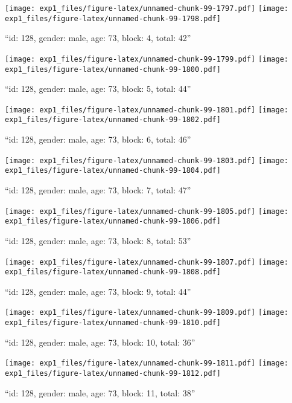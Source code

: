 \documentclass[,]{article}
\begin{document}
\texttt{[image: exp1\_files/figure-latex/unnamed-chunk-99-1797.pdf]}
\texttt{[image: exp1\_files/figure-latex/unnamed-chunk-99-1798.pdf]}

\newpage
[1] 

``id: 128, gender: male, age: 73, block: 4, total: 42''

\texttt{[image: exp1\_files/figure-latex/unnamed-chunk-99-1799.pdf]}
\texttt{[image: exp1\_files/figure-latex/unnamed-chunk-99-1800.pdf]}

\newpage
[1] 

``id: 128, gender: male, age: 73, block: 5, total: 44''

\texttt{[image: exp1\_files/figure-latex/unnamed-chunk-99-1801.pdf]}
\texttt{[image: exp1\_files/figure-latex/unnamed-chunk-99-1802.pdf]}

\newpage
[1] 

``id: 128, gender: male, age: 73, block: 6, total: 46''

\texttt{[image: exp1\_files/figure-latex/unnamed-chunk-99-1803.pdf]}
\texttt{[image: exp1\_files/figure-latex/unnamed-chunk-99-1804.pdf]}

\newpage
[1] 

``id: 128, gender: male, age: 73, block: 7, total: 47''

\texttt{[image: exp1\_files/figure-latex/unnamed-chunk-99-1805.pdf]}
\texttt{[image: exp1\_files/figure-latex/unnamed-chunk-99-1806.pdf]}

\newpage
[1] 

``id: 128, gender: male, age: 73, block: 8, total: 53''

\texttt{[image: exp1\_files/figure-latex/unnamed-chunk-99-1807.pdf]}
\texttt{[image: exp1\_files/figure-latex/unnamed-chunk-99-1808.pdf]}

\newpage
[1] 

``id: 128, gender: male, age: 73, block: 9, total: 44''

\texttt{[image: exp1\_files/figure-latex/unnamed-chunk-99-1809.pdf]}
\texttt{[image: exp1\_files/figure-latex/unnamed-chunk-99-1810.pdf]}

\newpage
[1] 

``id: 128, gender: male, age: 73, block: 10, total: 36''

\texttt{[image: exp1\_files/figure-latex/unnamed-chunk-99-1811.pdf]}
\texttt{[image: exp1\_files/figure-latex/unnamed-chunk-99-1812.pdf]}

\newpage
[1] 

``id: 128, gender: male, age: 73, block: 11, total: 38''
\end{document}
